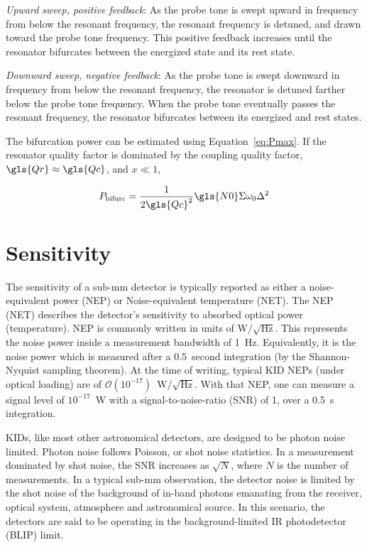 \textit{Upward sweep, positive feedback}:
As the probe tone is swept upward in frequency from below the resonant frequency, the resonant frequency is detuned, and drawn toward the probe tone frequency. This positive feedback increases until the resonator bifurcates between the energized state and its rest state.

\textit{Downward sweep, negative feedback}:
As the probe tone is swept downward in frequency from below the resonant frequency, the resonator is detuned farther below the probe tone frequency. When the probe tone eventually passes the resonant frequency, the resonator bifurcates between its energized and rest states.

The bifurcation power can be estimated using Equation~\ref{eq:Pmax}. If the resonator quality factor is dominated by the coupling quality factor, $\gls{Qr} \approx \gls{Qc}$, and $x \ll 1$,

\begin{equation} \label{eq:Pbifurc}
  P_{\mathrm{bifurc}} = \frac{1}{2 \gls{Qc}^{2}}\gls{N0}\Sigma \omega_{0}\Delta^{2}
\end{equation}

\section{Sensitivity} \label{sec:sensitivity}

The sensitivity of a sub-mm detector is typically reported as either a noise-equivalent power (NEP) or Noise-equivalent temperature (NET). The NEP (NET) describes the detector's sensitivity to absorbed optical power (temperature). NEP is commonly written in units of $\mathrm{W}/\sqrt{\mathrm{Hz}}$. This represents the noise power inside a measurement bandwidth of 1~Hz. Equivalently, it is the noise power which is measured after a 0.5~second integration (by the Shannon-Nyquist sampling theorem). At the time of writing, typical KID NEPs (under optical loading) are of $\mathcal{O}(10^{-17})$~$\mathrm{W}/\sqrt{\mathrm{Hz}}$. With that NEP, one can measure a signal level of $10^{-17}$~W with a signal-to-noise-ratio (SNR) of 1, over a 0.5~s integration.

KIDs, like most other astronomical detectors, are designed to be photon noise limited. Photon noise follows Poisson, or shot noise statistics. In a measurement dominated by shot noise, the SNR increases as $\sqrt{N}$, where $N$ is the number of measurements. In a typical sub-mm observation, the detector noise is limited by the shot noise of the background of in-band photons emanating from the receiver, optical system, atmosphere and astronomical source. In this scenario, the detectors are said to be operating in the background-limited IR photodetector (BLIP) limit.

